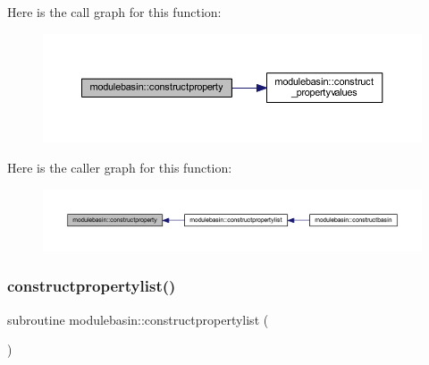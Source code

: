 Here is the call graph for this function\+:\nopagebreak
\begin{figure}[H]
\begin{center}
\leavevmode
\includegraphics[width=350pt]{namespacemodulebasin_afc1a708f812fbecd655d2ec2ec7d7ae7_cgraph}
\end{center}
\end{figure}
Here is the caller graph for this function\+:\nopagebreak
\begin{figure}[H]
\begin{center}
\leavevmode
\includegraphics[width=350pt]{namespacemodulebasin_afc1a708f812fbecd655d2ec2ec7d7ae7_icgraph}
\end{center}
\end{figure}
\mbox{\label{namespacemodulebasin_a914a8d07507d5ca843132c144c8e61f7}} 
\subsubsection{\texorpdfstring{constructpropertylist()}{constructpropertylist()}}
{\footnotesize\ttfamily subroutine modulebasin\+::constructpropertylist (\begin{DoxyParamCaption}{ }\end{DoxyParamCaption})\hspace{0.3cm}{\ttfamily [private]}}

